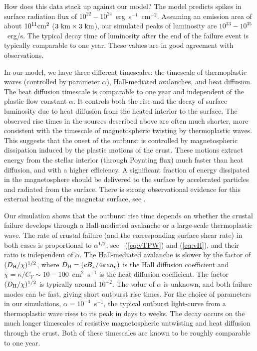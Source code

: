 How does this data stack up against our model?  
The model predicts spikes in surface radiation flux of $10^{22}-10^{24}$~erg~s$^{-1}$~cm$^{-2}$. 
Assuming an emission area of about $10^{11}\hbox{cm}^2$ ($3\hbox{~km}\times 3\hbox{~km}$), our simulated peaks of luminosity are $10^{33}-10^{35}$~erg/s. 
The typical decay time of luminosity after the end of the failure event is typically comparable to one year. These values are in good agreement with observations.

In our model, we have three different timescales: the timescale of thermoplastic waves (controlled by parameter $\alpha$), Hall-mediated avalanches, and heat diffusion. 
The heat diffusion timescale is  comparable to one year and independent of the plastic-flow constant $\alpha$. 
It controls both the rise and the decay of surface luminosity due to heat diffusion from the heated interior to the surface. 
The observed rise times in the sources described above are often much shorter, more consistent with the timescale of magnetospheric twisting by thermoplastic waves. 
This suggests that the onset of the outburst is controlled by magnetospheric dissipation induced by the plastic motions of the crust. 
These motions extract energy from the stellar interior (through Poynting flux) much faster than heat diffusion, and with a higher efficiency. 
A significant fraction of energy dissipated in the magnetosphere should be delivered to the surface by accelerated particles and radiated from the surface. 
There is strong observational evidence for this external heating of the magnetar surface, see \citet{2016ApJ...833..261B}.

Our simulation shows that the outburst rise time depends on whether the crustal failure develops through a Hall-mediated avalanche or a large-scale thermoplastic wave.
The rate of crustal failure (and the corresponding surface shear rate) in both cases is proportional to $\alpha^{1/2}$, see \Eqs~(\ref{eq:vTPW}) and (\ref{eq:vH}), and their ratio is independent of $\alpha$. 
The Hall-mediated avalanche is slower by the factor of $(D_{\rm H}/\chi)^{1/2}$, where $D_{\rm H}=(cB_z/4\pi en_e)$ is the Hall diffusion coefficient and $\chi=\kappa/C_V\sim 10-100$~cm$^2$~s$^{-1}$ is the heat diffusion coefficient.
The factor $(D_{\rm H}/\chi)^{1/2}$ is typically around $10^{-2}$. The value of $\alpha$ is unknown, and both failure modes can be fast, giving short outburst rise times.
For the choice of parameters in our simulations, $\alpha=10^{-4}$~s$^{-1}$, the typical outburst light-curve from a  thermoplastic wave rises to its peak in days to weeks.
The decay occurs on the much longer timescales of resistive magnetospheric untwisting and heat diffusion through the crust. Both of these timescales are known to be roughly comparable to one year.

